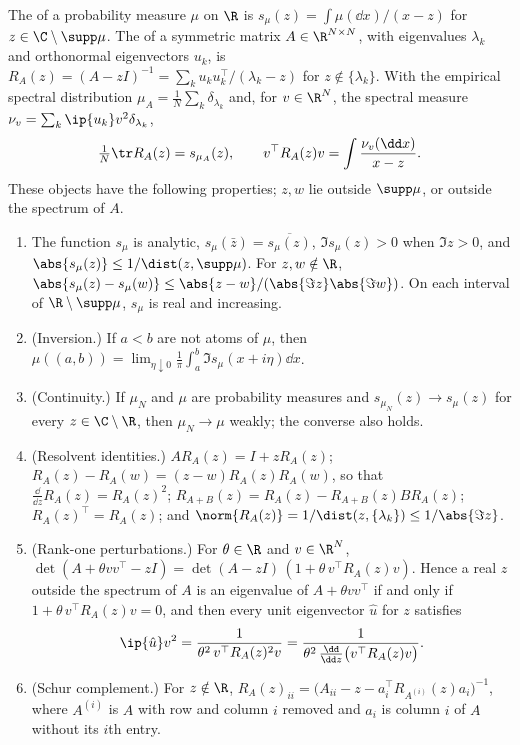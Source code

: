\begin{refsection}
\begin{definition}\label{def:toolkit:stieltjes}
The  of a probability measure $\mu$ on $\R$ is $s_\mu(z)=\int\mu(\dd x)/(x-z)$ for $z\in\C\setminus\supp\mu$. The  of a symmetric matrix $A\in\R^{N\times N}$, with eigenvalues $\lambda_k$ and orthonormal eigenvectors $u_k$, is $R_A(z)=(A-zI)^{-1}=\sum_ku_ku_k^\top/(\lambda_k-z)$ for $z\notin\{\lambda_k\}$. With the empirical spectral distribution $\mu_A=\frac1N\sum_k\delta_{\lambda_k}$ and, for $v\in\R^N$, the spectral measure $\nu_v=\sum_k\ip{u_k}v^2\delta_{\lambda_k}$,
\[
\tfrac1N\tr R_A(z)=s_{\mu_A}(z),\qquad v^\top R_A(z)v=\int\frac{\nu_v(\dd x)}{x-z}.
\]
These objects have the following properties; $z,w$ lie outside $\supp\mu$, or outside the spectrum of $A$.
\begin{enumerate}
\item The function $s_\mu$ is analytic, $s_\mu(\bar z)=\overline{s_\mu(z)}$, $\Im s_\mu(z)>0$ when $\Im z>0$, and $\abs{s_\mu(z)}\le1/\dist(z,\supp\mu)$. For $z,w\notin\R$, $\abs{s_\mu(z)-s_\mu(w)}\le\abs{z-w}/(\abs{\Im z}\abs{\Im w})$. On each interval of $\R\setminus\supp\mu$, $s_\mu$ is real and increasing.
\item (Inversion.) If $a<b$ are not atoms of $\mu$, then $\mu((a,b))=\lim_{\eta\downarrow0}\frac1\pi\int_a^b\Im s_\mu(x+i\eta)\dd x$.
\item (Continuity.) If $\mu_N$ and $\mu$ are probability measures and $s_{\mu_N}(z)\to s_\mu(z)$ for every $z\in\C\setminus\R$, then $\mu_N\to\mu$ weakly; the converse also holds.
\item (Resolvent identities.) $AR_A(z)=I+zR_A(z)$; $R_A(z)-R_A(w)=(z-w)R_A(z)R_A(w)$, so that $\frac{\dd}{\dd z}R_A(z)=R_A(z)^2$; $R_{A+B}(z)=R_A(z)-R_{A+B}(z)BR_A(z)$; $R_A(z)^\top=R_A(z)$; and $\norm{R_A(z)}=1/\dist(z,\{\lambda_k\})\le1/\abs{\Im z}$.
\item (Rank-one perturbations.) For $\theta\in\R$ and $v\in\R^N$, $\det(A+\theta vv^\top-zI)=\det(A-zI)\,(1+\theta\,v^\top R_A(z)v)$. Hence a real $z$ outside the spectrum of $A$ is an eigenvalue of $A+\theta vv^\top$ if and only if $1+\theta\,v^\top R_A(z)v=0$, and then every unit eigenvector $\hat u$ for $z$ satisfies
\begin{equation}\label{eq:toolkit:overlap}
\ip{\hat u}v^2=\frac1{\theta^2\,v^\top R_A(z)^2v}=\frac1{\theta^2\,\frac{\dd}{\dd z}\bigl(v^\top R_A(z)v\bigr)}.
\end{equation}
\item (Schur complement.) For $z\notin\R$, $R_A(z)_{ii}=\bigl(A_{ii}-z-a_i^\top R_{A^{(i)}}(z)a_i\bigr)^{-1}$, where $A^{(i)}$ is $A$ with row and column $i$ removed and $a_i$ is column $i$ of $A$ without its $i$th entry.
\end{enumerate}
\end{definition}


\end{refsection}
